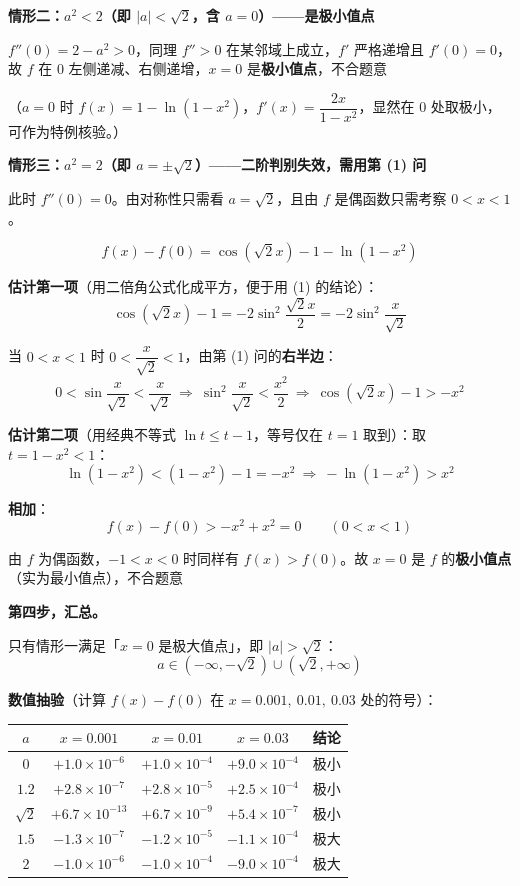 \begin{answer}
\textbf{情形二：$a^{2}<2$（即 $|a|<\sqrt2$，含 $a=0$）——是极小值点 }

$f''(0)=2-a^{2}>0$，同理 $f''>0$ 在某邻域上成立，$f'$ 严格递增且 $f'(0)=0$，故 $f$ 在 $0$ 左侧递减、右侧递增，$x=0$ 是\textbf{极小值点}，不合题意 

（$a=0$ 时 $f(x)=1-\ln\left(1-x^{2}\right)$，$f'(x)=\dfrac{2x}{1-x^{2}}$，显然在 $0$ 处取极小，可作为特例核验。）

\textbf{情形三：$a^{2}=2$（即 $a=\pm\sqrt2$）——二阶判别失效，需用第 (1) 问 }

此时 $f''(0)=0$。由对称性只需看 $a=\sqrt2$，且由 $f$ 是偶函数只需考察 $0<x<1$。

\nopagebreak[4]
\[f(x)-f(0)=\cos\left(\sqrt2x\right)-1-\ln\left(1-x^{2}\right)\]

\textbf{估计第一项}（用二倍角公式化成平方，便于用 (1) 的结论）：
\nopagebreak[4]
\[\cos\left(\sqrt2x\right)-1=-2\sin^{2}\frac{\sqrt2x}2=-2\sin^{2}\frac x{\sqrt2}\]

当 $0<x<1$ 时 $0<\dfrac x{\sqrt2}<1$，由第 (1) 问的\textbf{右半边}：
\nopagebreak[4]
\[0<\sin\frac x{\sqrt2}<\frac x{\sqrt2}\ \Longrightarrow\ \sin^{2}\frac x{\sqrt2}<\frac{x^{2}}2\ \Longrightarrow\ \cos\left(\sqrt2x\right)-1>-x^{2}\]

\textbf{估计第二项}（用经典不等式 $\ln t\le t-1$，等号仅在 $t=1$ 取到）：取 $t=1-x^{2}<1$：
\nopagebreak[4]
\[\ln\left(1-x^{2}\right)<\left(1-x^{2}\right)-1=-x^{2}\ \Longrightarrow\ -\ln\left(1-x^{2}\right)>x^{2}\]

\textbf{相加}：
\nopagebreak[4]
\[f(x)-f(0)>-x^{2}+x^{2}=0\qquad(0<x<1)\]

由 $f$ 为偶函数，$-1<x<0$ 时同样有 $f(x)>f(0)$。故 $x=0$ 是 $f$ 的\textbf{极小值点}（实为最小值点），不合题意 

\textbf{第四步，汇总。}

只有情形一满足「$x=0$ 是极大值点」，即 $|a|>\sqrt2$：
\nopagebreak[4]
\[\boxed{a\in\left(-\infty,-\sqrt2\right)\cup\left(\sqrt2,+\infty\right)}\]

\textbf{数值抽验}（计算 $f(x)-f(0)$ 在 $x=0.001,\ 0.01,\ 0.03$ 处的符号）：

\begin{center}
\begin{tabular}{ccccc}
\toprule
$a$ & $x=0.001$ & $x=0.01$ & $x=0.03$ & 结论 \\
\midrule
$0$ & $+1.0\times10^{-6}$ & $+1.0\times10^{-4}$ & $+9.0\times10^{-4}$ & 极小  \\
$1.2$ & $+2.8\times10^{-7}$ & $+2.8\times10^{-5}$ & $+2.5\times10^{-4}$ & 极小  \\
$\sqrt2$ & $+6.7\times10^{-13}$ & $+6.7\times10^{-9}$ & $+5.4\times10^{-7}$ & 极小  \\
$1.5$ & $-1.3\times10^{-7}$ & $-1.2\times10^{-5}$ & $-1.1\times10^{-4}$ & 极大  \\
$2$ & $-1.0\times10^{-6}$ & $-1.0\times10^{-4}$ & $-9.0\times10^{-4}$ & 极大  \\
\bottomrule
\end{tabular}
\end{center}


\end{answer}
